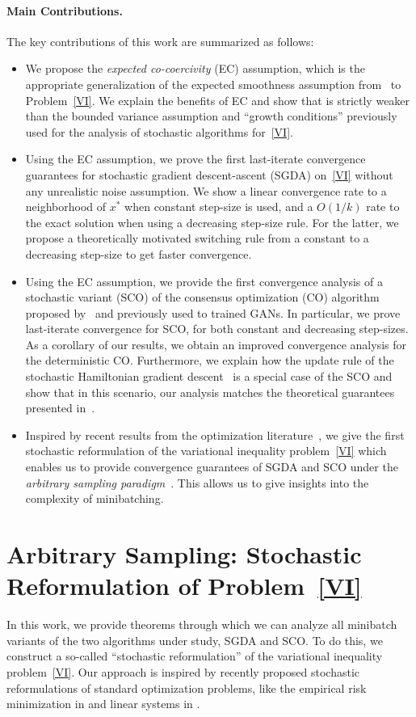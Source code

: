 \documentclass{article}
\begin{document}
\paragraph{Main Contributions.}
The key contributions of this work are summarized as follows:
\vspace{-1mm}
\begin{itemize}[leftmargin=*]
\item We propose the \emph{expected co-coercivity} (EC) assumption, which is the appropriate generalization of the expected smoothness assumption from~\citet{gower2019sgd} to Problem~\eqref{VI}. We explain the benefits of EC and show that is strictly weaker than the bounded variance assumption and ``growth conditions'' previously used for the analysis of stochastic algorithms for~\eqref{VI}.
\item Using the EC assumption, we prove the first last-iterate convergence guarantees for stochastic gradient descent-ascent (SGDA) on~\eqref{VI} without any unrealistic noise assumption. We show a linear convergence rate to a neighborhood of $x^*$ when constant step-size is used, and a $O(1/k)$ rate to the exact solution when using a decreasing step-size rule. For the latter, we propose a theoretically motivated switching rule from a constant to a decreasing step-size to get faster convergence.
\item Using the EC assumption, we provide the first convergence analysis of a stochastic variant (SCO) of the consensus optimization (CO) algorithm proposed by~\cite{mescheder2017numerics} and previously used to trained GANs. In particular, we prove last-iterate convergence for SCO, for both constant and decreasing step-sizes. As a corollary of our results, we obtain an improved convergence analysis for the deterministic CO. Furthermore, we explain how the update rule of the stochastic Hamiltonian gradient descent~\citep{loizou2020stochastic} is a special case of the SCO and show that in this scenario, our analysis matches the theoretical guarantees presented in~\citet{loizou2020stochastic}. 
\item Inspired by recent results from the optimization literature~\citep{gower2019sgd}, we give the first stochastic reformulation of the variational inequality problem~\eqref{VI} which enables us to provide convergence guarantees of SGDA and SCO under the \emph{arbitrary sampling paradigm}~\citep{richtarik2016optimal}. This allows us to give insights into the complexity of minibatching.
\end{itemize}
\section{Arbitrary Sampling: Stochastic Reformulation of Problem~\eqref{VI}}
\label{Sec:sampling}
In this work, we provide theorems through which we can analyze all minibatch variants of the two algorithms under study, SGDA and SCO. To do this, we construct a so-called ``stochastic reformulation'' of the variational inequality problem~\eqref{VI}. Our approach is inspired by recently proposed stochastic reformulations of standard optimization problems, like the empirical risk minimization in \cite{gower2019sgd} and linear systems in \citet{richtarik2020stochastic,loizou2020convergence,loizou2020momentum}.
\end{document}
